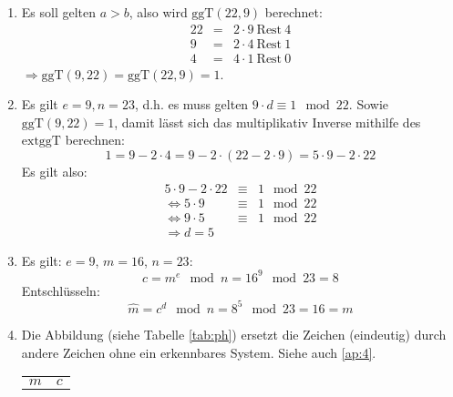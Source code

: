\documentclass[DIN, pagenumber=false, fontsize=11pt, parskip=half]{scrartcl}
\begin{document}
    \begin{enumerate}[label=\alph*)]
        \item Es soll gelten $a>b$, also wird $\text{ggT}(22, 9)$ berechnet:
            \begin{eqnarray*}
                22 &=& 2 \cdot 9\ \text{Rest}\ 4\\ 
                9  &=& 2 \cdot 4\ \text{Rest}\ 1\\
                4  &=& 4 \cdot 1\ \text{Rest}\ 0
            \end{eqnarray*}
            $\Rightarrow \text{ggT}(9, 22) = \text{ggT}(22, 9) = 1$.
        \item Es gilt $e=9, n = 23$, d.h. es muss gelten $9 \cdot d \equiv 1 \mod 22$.
            Sowie $\text{ggT}(9, 22) = 1$, damit lässt sich das multiplikativ
            Inverse mithilfe des $\text{extggT}$ berechnen:
            \begin{equation}
                1 = 9 - 2 \cdot 4 = 9 - 2 \cdot (22 - 2 \cdot 9) = 5 \cdot 9 - 2 \cdot 22
            \end{equation}
            Es gilt also:
            \begin{eqnarray*}
                5 \cdot 9 - 2 \cdot 22 &\equiv& 1 \mod 22 \\
                \Leftrightarrow 5 \cdot 9 &\equiv& 1 \mod 22 \\
                \Leftrightarrow 9 \cdot 5 &\equiv& 1 \mod 22 \\
                \Rightarrow d = 5
            \end{eqnarray*}
        \item Es gilt: $e=9$, $m=16$, $n=23$:
            \begin{equation}
                c = m^e \mod n = 16^9 \mod 23 = 8
            \end{equation}
            Entschlüsseln:
            \begin{equation}
                \hat{m} = c^d \mod n = 8^5 \mod 23 = 16 = m
            \end{equation}
        \item Die Abbildung (siehe Tabelle \ref{tab:ph}) ersetzt die Zeichen (eindeutig)
            durch andere Zeichen ohne ein erkennbares System. Siehe auch \ref{ap:4}.
            \begin{table}[H]
                \centering
                \begin{tabular}{cc}
                    \toprule
                    $m$ & $c$ \\

\end{tabular}
\end{table}
\end{enumerate}
\end{document}
